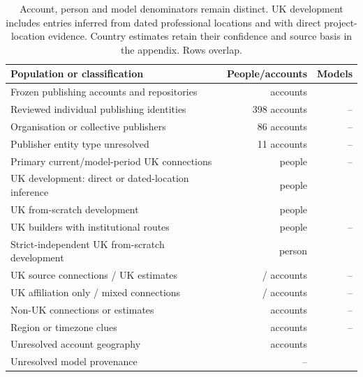 \begin{table}[htbp]
\centering\small
\begin{tabularx}{\textwidth}{Xrr}
\toprule
Population or classification & People/accounts & Models \\
\midrule
Frozen publishing accounts and repositories & \CensusAccounts{} accounts & \CensusModels{} \\
Reviewed individual publishing identities & 398 accounts & -- \\
Organisation or collective publishers & 86 accounts & -- \\
Publisher entity type unresolved & 11 accounts & -- \\
Primary current/model-period UK connections & \PrimaryPeople{} people & -- \\
UK development: direct or dated-location inference & \UKBuilders{} people & \UKBuiltModels{} \\
UK from-scratch development & \ScratchBuilders{} people & \ScratchModels{} \\
UK builders with institutional routes & \UKInstitutional{} people & -- \\
Strict-independent UK from-scratch development & \StrictBuilders{} person & \StrictModels{} \\
UK source connections / UK estimates & \UKSourceConnectionAccounts{} / \UKEstimateAccounts{} accounts & -- \\
UK affiliation only / mixed connections & \UKAffiliationAccounts{} / \MixedConnectionAccounts{} accounts & -- \\
Non-UK connections or estimates & \NonUKConnectionOrEstimateAccounts{} accounts & -- \\
Region or timezone clues & \RegionClueAccounts{} accounts & -- \\
Unresolved account geography & \UnresolvedGeographyAccounts{} accounts & \UnresolvedGeographyModels{} \\
Unresolved model provenance & -- & \UnresolvedProvenanceModels{} \\
\bottomrule
\end{tabularx}
\caption{Account, person and model denominators remain distinct. UK development includes \InferredUKBuildModels{} entries inferred from dated professional locations and \DirectUKBuildModels{} with direct project-location evidence. Country estimates retain their confidence and source basis in the appendix. Rows overlap.}
\label{tab:counts}
\end{table}
